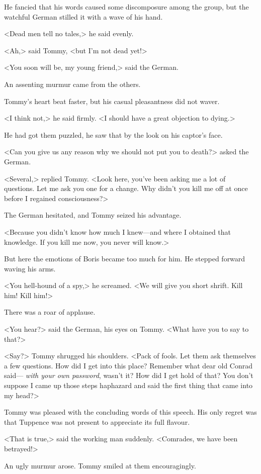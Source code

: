 He fancied that his words caused some discomposure among the group, but the watchful German stilled it with a wave of his hand.

<Dead men tell no tales,> he said evenly.

<Ah,> said Tommy, <but I'm not dead yet!>

<You soon will be, my young friend,> said the German.

An assenting murmur came from the others.

Tommy's heart beat faster, but his casual pleasantness did not waver.

<I think not,> he said firmly. <I should have a great objection to dying.>

He had got them puzzled, he saw that by the look on his captor's face.

<Can you give us any reason why we should not put you to death?> asked the German.

<Several,> replied Tommy. <Look here, you've been asking me a lot of questions. Let me ask you one for a change. Why didn't you kill me off at once before I regained consciousness?>

The German hesitated, and Tommy seized his advantage.

<Because you didn't know how much I knew—and where I obtained that knowledge. If you kill me now, you never will know.>

But here the emotions of Boris became too much for him. He stepped forward waving his arms.

<You hell-hound of a spy,> he screamed. <We will give you short shrift. Kill him! Kill him!>

There was a roar of applause.

<You hear?> said the German, his eyes on Tommy. <What have you to say to that?>

<Say?> Tommy shrugged his shoulders. <Pack of fools. Let them ask themselves a few questions. How did I get into this place? Remember what dear old Conrad said— \emph{with your own password}, wasn't it? How did I get hold of that? You don't suppose I came up those steps haphazard and said the first thing that came into my head?>

Tommy was pleased with the concluding words of this speech. His only regret was that Tuppence was not present to appreciate its full flavour.

<That is true,> said the working man suddenly. <Comrades, we have been betrayed!>

An ugly murmur arose. Tommy smiled at them encouragingly.

